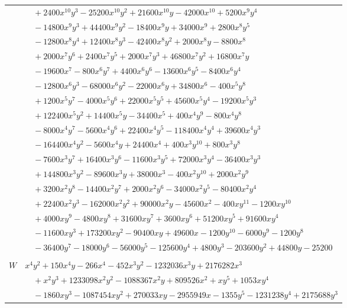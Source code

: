 \documentclass[11pt]{article}
\begin{document}
\begin{longtable}{@{}ll@{}}
 & $\quad +2400x^{10}y^{3}-25200x^{10}y^{2}+21600x^{10}y-42000x^{10}+5200x^{9}y^{4}$\\
 & $\quad -14800x^{9}y^{3}+44400x^{9}y^{2}-18400x^{9}y+34000x^{9}+2800x^{8}y^{5}$\\
 & $\quad -12800x^{8}y^{4}+12400x^{8}y^{3}-42400x^{8}y^{2}+2000x^{8}y-8800x^{8}$\\
 & $\quad +2000x^{7}y^{6}+2400x^{7}y^{5}+2000x^{7}y^{3}+46800x^{7}y^{2}+16800x^{7}y$\\
 & $\quad -19600x^{7}-800x^{6}y^{7}+4400x^{6}y^{6}-13600x^{6}y^{5}-8400x^{6}y^{4}$\\
 & $\quad -12800x^{6}y^{3}-68000x^{6}y^{2}-22000x^{6}y+34800x^{6}-400x^{5}y^{8}$\\
 & $\quad +1200x^{5}y^{7}-4000x^{5}y^{6}+22000x^{5}y^{5}+45600x^{5}y^{4}-19200x^{5}y^{3}$\\
 & $\quad +122400x^{5}y^{2}+14400x^{5}y-34400x^{5}+400x^{4}y^{9}-800x^{4}y^{8}$\\
 & $\quad -8000x^{4}y^{7}-5600x^{4}y^{6}+22400x^{4}y^{5}-118400x^{4}y^{4}+39600x^{4}y^{3}$\\
 & $\quad -164400x^{4}y^{2}-5600x^{4}y+24400x^{4}+400x^{3}y^{10}+800x^{3}y^{8}$\\
 & $\quad -7600x^{3}y^{7}+16400x^{3}y^{6}-11600x^{3}y^{5}+72000x^{3}y^{4}-36400x^{3}y^{3}$\\
 & $\quad +144800x^{3}y^{2}-89600x^{3}y+38000x^{3}-400x^{2}y^{10}+2000x^{2}y^{9}$\\
 & $\quad +3200x^{2}y^{8}-14400x^{2}y^{7}+2000x^{2}y^{6}-34000x^{2}y^{5}-80400x^{2}y^{4}$\\
 & $\quad +22400x^{2}y^{3}-162000x^{2}y^{2}+90000x^{2}y-45600x^{2}-400xy^{11}-1200xy^{10}$\\
 & $\quad +4000xy^{9}-4800xy^{8}+31600xy^{7}+3600xy^{6}+51200xy^{5}+91600xy^{4}$\\
 & $\quad -11600xy^{3}+173200xy^{2}-90400xy+49600x-1200y^{10}-6000y^{9}-1200y^{8}$\\
 & $\quad -36400y^{7}-18000y^{6}-56000y^{5}-125600y^{4}+4800y^{3}-203600y^{2}+44800y-25200$\\
\addlinespace[3pt]
\multicolumn{2}{@{}l}{$i=42$, $m=8064$, neighbours $35,41,99,126,127,128,130,145,148,174,215$}\\
$W$ & $x^{4}y^{2}+150x^{4}y-266x^{4}-452x^{3}y^{2}-1232036x^{3}y+2176282x^{3}$\\
 & $\quad +x^{2}y^{3}+1233098x^{2}y^{2}-1088367x^{2}y+809526x^{2}+xy^{5}+1053xy^{4}$\\
 & $\quad -1860xy^{3}-1087454xy^{2}+270033xy-2955949x-1355y^{5}-1231238y^{4}+2175688y^{3}$\\

\end{longtable}
\end{document}
